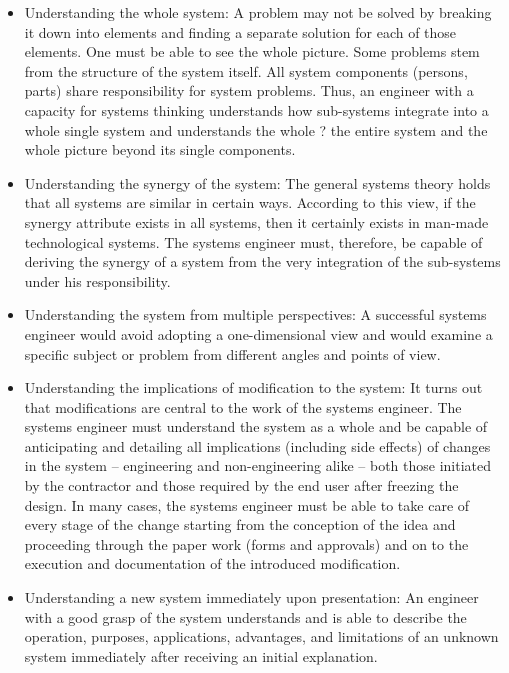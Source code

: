 \documentclass[11pt]{article}
\begin{document}
\begin{itemize}
\item Understanding the whole system: A problem may not be solved by breaking it down into elements and finding a separate solution for each of those elements. One must be able to see the whole picture. Some problems stem from the structure of the system itself. All system components (persons, parts) share responsibility for system problems.
Thus, an engineer with a capacity for systems thinking understands how sub-systems integrate into a whole single system and understands the whole ? the entire system and the whole picture beyond its single components.

\item Understanding the synergy of the system: The general systems theory holds that all systems are similar in certain ways. According to this view, if the synergy attribute exists in all systems, then it certainly exists in man-made technological systems. The systems engineer must, therefore, be capable of deriving the synergy of a system from the very integration of the sub-systems under his responsibility.

\item Understanding the system from multiple perspectives: A successful systems engineer would avoid adopting a one-dimensional view and would examine a specific subject or problem from different angles and points of view.

\item Understanding the implications of modification to the system: It turns out that modifications are central to the work of the systems engineer. The systems engineer must understand the system as a whole and be capable of anticipating and detailing all implications (including side effects) of changes in the system -- engineering and non-engineering alike -- both those initiated by the contractor and those required by the end user after freezing the design. In many cases, the systems engineer must be able to take care of every stage of the change starting from the conception of the idea and proceeding through the paper work (forms and approvals) and on to the execution and documentation of the introduced modification.

\item Understanding a new system immediately upon presentation: An engineer with a good grasp of the system understands and is able to describe the operation, purposes, applications, advantages, and limitations of an unknown system immediately after receiving an initial explanation.


\end{itemize}
\end{document}
